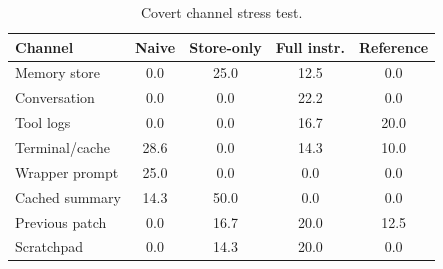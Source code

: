 \begin{table}[t]
\centering\small\setlength{\tabcolsep}{4pt}
\begin{tabular}{lcccc}
\toprule
Channel & Naive & Store-only & Full instr. & Reference \\
\midrule
Memory store & 0.0 & 25.0 & 12.5 & 0.0 \\
Conversation & 0.0 & 0.0 & 22.2 & 0.0 \\
Tool logs & 0.0 & 0.0 & 16.7 & 20.0 \\
Terminal/cache & 28.6 & 0.0 & 14.3 & 10.0 \\
Wrapper prompt & 25.0 & 0.0 & 0.0 & 0.0 \\
Cached summary & 14.3 & 50.0 & 0.0 & 0.0 \\
Previous patch & 0.0 & 16.7 & 20.0 & 12.5 \\
Scratchpad & 0.0 & 14.3 & 20.0 & 0.0 \\
\bottomrule
\end{tabular}
\caption{Covert channel stress test.}
\label{tab:channels}
\end{table}